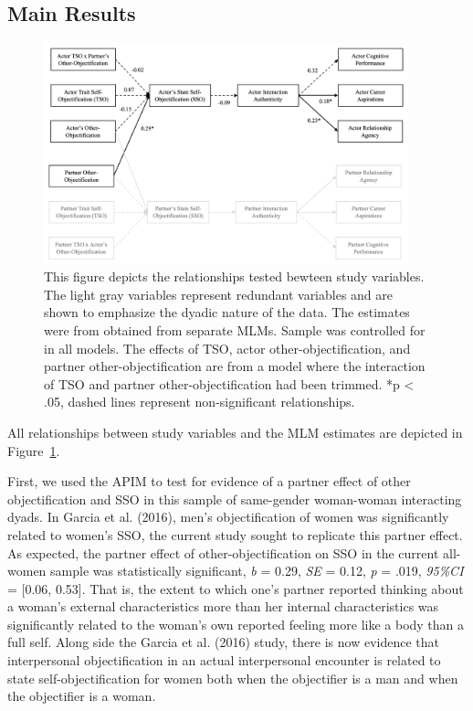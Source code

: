 \documentclass[man]{apa6}
\begin{document}
\subsection{Main Results}\label{main-results}

\begin{figure}
\includegraphics[width=400px]{figures/SEMfigure} \caption{This figure depicts the relationships tested bewteen study variables. The light gray variables represent redundant variables and are shown to emphasize the dyadic nature of the data. The estimates were from obtained from separate MLMs. Sample was controlled for in all models. The effects of TSO, actor other-objectification, and partner other-objectification are from a model where the interaction of TSO and partner other-objectification had been trimmed. *p < .05, dashed lines represent non-significant relationships.}\label{fig:semfigure}
\end{figure}

All relationships between study variables and the MLM estimates are
depicted in Figure~\ref{fig:semfigure}.

First, we used the APIM to test for evidence of a partner effect of
other objectification and SSO in this sample of same-gender woman-woman
interacting dyads. In Garcia et al. (2016), men's objectification of
women was significantly related to women's SSO, the current study sought
to replicate this partner effect. As expected, the partner effect of
other-objectification on SSO in the current all-women sample was
statistically significant, \emph{b} = 0.29, \emph{SE} = 0.12, \emph{p} =
.019, \emph{95\%CI} = {[}0.06, 0.53{]}. That is, the extent to which
one's partner reported thinking about a woman's external characteristics
more than her internal characteristics was significantly related to the
woman's own reported feeling more like a body than a full self. Along
side the Garcia et al. (2016) study, there is now evidence that
interpersonal objectification in an actual interpersonal encounter is
related to state self-objectification for women both when the
objectifier is a man and when the objectifier is a woman.
\end{document}
